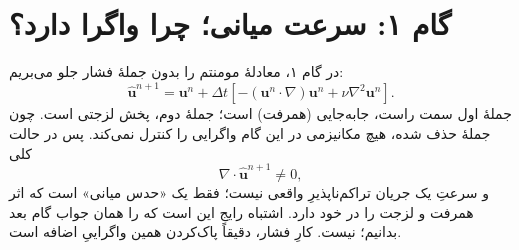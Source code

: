 \documentclass[12pt,a4paper]{article}
\begin{document}
\section{گام ۱: سرعت میانی؛ چرا واگرا دارد؟}
در گام ۱، معادلهٔ مومنتم را بدون جملهٔ فشار جلو می‌بریم:
\begin{equation}
\hat{\mathbf{u}}^{n+1}
= \mathbf{u}^n + \Delta t\left[
-(\mathbf{u}^n\cdot\nabla)\mathbf{u}^n + \nu\nabla^2\mathbf{u}^n
\right].
\end{equation}
جملهٔ اول سمت راست، جابه‌جایی (همرفت) است؛ جملهٔ دوم، پخش لزجتی است.
چون جملهٔ  حذف شده، هیچ مکانیزمی در این گام واگرایی را
کنترل نمی‌کند. پس در حالت کلی
\begin{equation}
\nabla\cdot\hat{\mathbf{u}}^{n+1} \neq 0,
\end{equation}
و  سرعتِ یک جریان تراکم‌ناپذیرِ واقعی نیست؛ فقط یک
«حدس میانی» است که اثر همرفت و لزجت را در خود دارد. اشتباه رایج این است
که  را همان جواب گام بعد بدانیم؛ نیست. کارِ فشار،
دقیقاً پاک‌کردن همین واگراییِ اضافه است.
\end{document}
